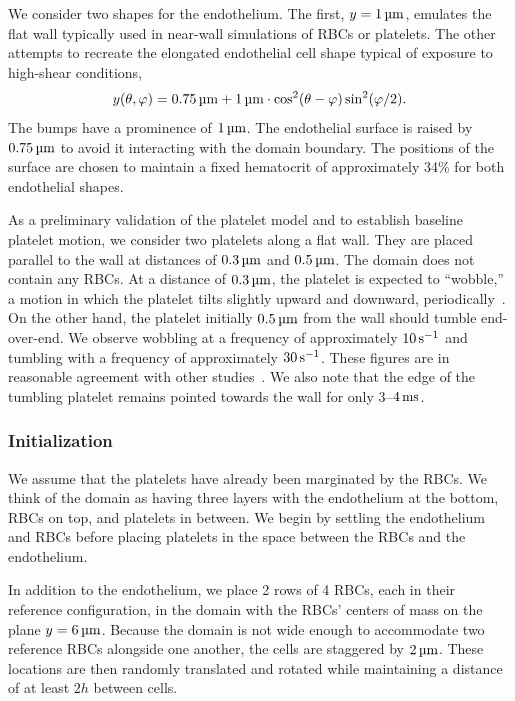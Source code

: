 We consider two shapes for the endothelium. The first, $y=1\um$, emulates the flat wall typically used in
near-wall simulations of RBCs or platelets. The other attempts to recreate the elongated endothelial cell shape
typical of exposure to high-shear conditions,
\begin{equation}
    y(\theta, \varphi) = 0.75\um + 1\um\cdot\cos^2(\theta-\varphi)\sin^2(\varphi/2).
\end{equation}
The bumps have a prominence of $1\um$. The endothelial surface is raised by $0.75\um$ to avoid it interacting with
the domain boundary. The positions of the surface are chosen to maintain a fixed hematocrit of approximately 34\%
for both endothelial shapes.

As a preliminary validation of the platelet model and to establish baseline platelet motion, we consider two
platelets along a flat wall. They are placed parallel to the wall at distances of $0.3\um$ and $0.5\um$. The
domain does not contain any RBCs. At a distance of $0.3\um$, the platelet is expected to ``wobble\qend,'' a motion in which
the platelet tilts slightly upward and downward, periodically~\cite{King:2005fv}. On the other hand, the platelet
initially $0.5\um$ from the wall should tumble end-over-end. We observe wobbling at a frequency of approximately
$10\persec$ and tumbling with a frequency of approximately $30\persec$. These figures are in reasonable agreement
with other studies~\cite{King:2005fv}. We also note that the edge of the tumbling platelet remains pointed towards
the wall for only 3--$4\ms$.

\subsubsection{Initialization}\label{sec:blood-init}

We assume that the platelets have already been marginated by the RBCs. We think of the domain as having three
layers with the endothelium at the bottom, RBCs on top, and platelets in between. We begin by settling the
endothelium and RBCs before placing platelets in the space between the RBCs and the endothelium.

In addition to the endothelium, we place 2 rows of 4 RBCs, each in their reference configuration, in the domain
with the RBCs' centers of mass on the plane $y=6\um$.  Because the domain is not wide enough to accommodate two
reference RBCs alongside one another, the cells are staggered by $2\um$. These locations are then randomly
translated and rotated while maintaining a distance of at least $2h$ between cells.


